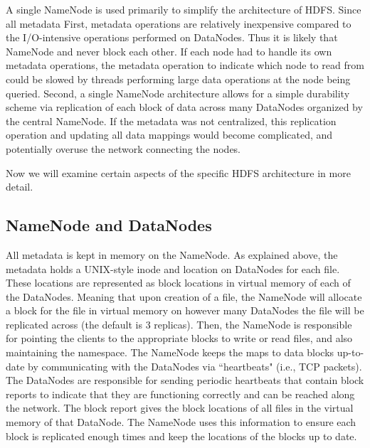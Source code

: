 \documentclass[11pt, a4paper]{article}
\begin{document}
\begin{multicols*}{2}
A single NameNode is used primarily to simplify the architecture of HDFS. Since all metadata First, metadata operations are relatively inexpensive compared to the I/O-intensive operations performed on DataNodes. Thus it is likely that  NameNode and never block each other. If each node had to handle its own metadata operations, the metadata operation to indicate which node to read from could be slowed by threads performing large data operations at the node being queried. Second, a single NameNode architecture allows for a simple durability scheme via replication of each block of data across many DataNodes organized by the central NameNode. If the metadata was not centralized, this replication operation and updating all data mappings would become complicated, and potentially overuse the network connecting the nodes.

Now we will examine certain aspects of the specific HDFS architecture in more detail. 

\subsection{NameNode and DataNodes}


All metadata is kept in memory on the NameNode. As explained above, the metadata holds a UNIX-style inode and location on DataNodes for each file. These locations are represented as block locations in virtual memory of each of the DataNodes. Meaning that upon creation of a file, the NameNode will allocate a block for the file in virtual memory on however many DataNodes the file will be replicated across (the default is 3 replicas). Then, the NameNode is responsible for pointing the clients to the appropriate blocks to write or read files, and also maintaining the namespace. The NameNode keeps the maps to data blocks up-to-date by communicating with the DataNodes via ``heartbeats" (i.e., TCP packets). The DataNodes are responsible for sending periodic heartbeats that contain block reports to indicate that they are functioning correctly and can be reached along the network. The block report gives the block locations of all files in the virtual memory of that DataNode. The NameNode uses this information to ensure each block is replicated enough times and keep the locations of the blocks up to date. 


\end{multicols*}
\end{document}
